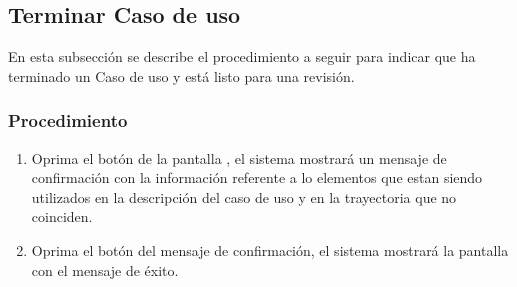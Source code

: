 \subsection{Terminar Caso de uso}

En esta subsección se describe el procedimiento a seguir para indicar que ha terminado un Caso de uso y está listo para una revisión.

\subsubsection{Procedimiento}
\begin{enumerate}
	\item Oprima el botón \btnTerminar de la pantalla , el sistema mostrará un mensaje de confirmación con la información referente a 
	lo elementos que estan siendo utilizados en la descripción del caso de uso y en la trayectoria que no coinciden.
	
	\item Oprima el botón  del mensaje de confirmación, el sistema mostrará la pantalla  con el mensaje de éxito.
\end{enumerate}

